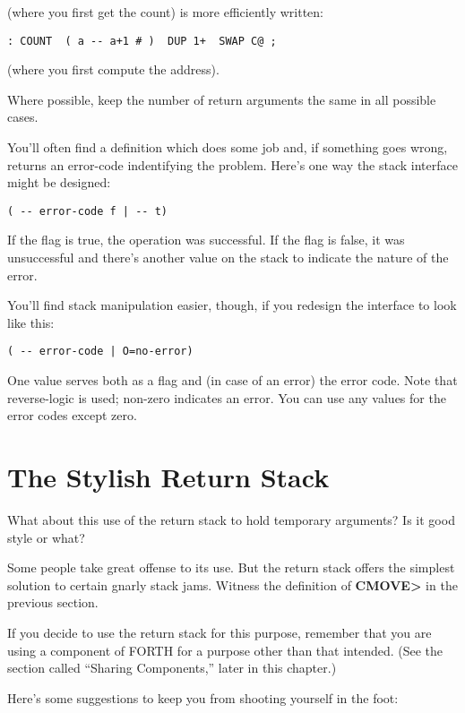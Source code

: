 (where you first get the count) is more efficiently written:

\begin{verbatim}
: COUNT  ( a -- a+1 # )  DUP 1+  SWAP C@ ;
\end{verbatim}

(where you first compute the address).

\begin{tip}
Where possible, keep the number of return arguments the same in all
possible cases.
\end{tip}
You'll often find a definition which does some job and, if something goes
wrong, returns an error-code indentifying the problem. Here's one way
the stack interface might be designed:

\begin{verbatim}
( -- error-code f | -- t)
\end{verbatim}

If the flag is true, the operation was successful. If the flag is false, it was
unsuccessful and there's another value on the stack to indicate the nature
of the error.

You'll find stack manipulation easier, though, if you redesign the interface
to look like this:

\begin{verbatim}
( -- error-code | O=no-error)
\end{verbatim}

One value serves both as a flag and (in case of an error) the error code.
Note that reverse-logic is used; non-zero indicates an error. You can use
any values for the error codes except zero.

\section{The Stylish Return Stack}

What about this use of the return stack to hold temporary arguments? Is
it good style or what?

Some people take great offense to its use. But the return stack
offers the simplest solution to certain gnarly stack jams. Witness the
definition of \textbf{CMOVE>} in the previous section.

If you decide to use the return stack for this purpose, remember
that you are using a component of FORTH for a purpose other than that
intended. (See the section called ``Sharing Components,'' later in this
chapter.)

Here's some suggestions to keep you from shooting yourself in the
foot:

